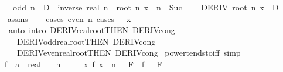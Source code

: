 \begin{isabellebody}
\ \ \ \ \ {\isachardoublequoteopen}odd\ n\ {\isasymLongrightarrow}\ D\ {\isacharequal}{\kern0pt}\ inverse\ {\isacharparenleft}{\kern0pt}real\ n\ {\isacharasterisk}{\kern0pt}\ root\ n\ x\ {\isacharcircum}{\kern0pt}\ {\isacharparenleft}{\kern0pt}n\ {\isacharminus}{\kern0pt}\ Suc\ {}{\isacharparenright}{\kern0pt}{\isacharparenright}{\kern0pt}{\isachardoublequoteclose}\isanewline
\ \ \ {\isachardoublequoteopen}DERIV\ {\isacharparenleft}{\kern0pt}root\ n{\isacharparenright}{\kern0pt}\ x\ {\isacharcolon}{\kern0pt}{\isachargreater}{\kern0pt}\ D{\isachardoublequoteclose}\isanewline
%
\isadelimproof
\ \ %
\endisadelimproof
%
\isatagproof
{}\isamarkupfalse%
\ assms\isanewline
\ \ \isamarkupfalse%
\ {\isacharparenleft}{\kern0pt}cases\ {\isachardoublequoteopen}even\ n{\isachardoublequoteclose}{\isacharcomma}{\kern0pt}\ cases\ {\isachardoublequoteopen}{}\ {\isacharless}{\kern0pt}\ x{\isachardoublequoteclose}{\isacharparenright}{\kern0pt}\isanewline
\ \ \ \ {\isacharparenleft}{\kern0pt}auto\ intro{\isacharcolon}{\kern0pt}\ DERIV{\isacharunderscore}{\kern0pt}real{\isacharunderscore}{\kern0pt}root{\isacharbrackleft}{\kern0pt}THEN\ DERIV{\isacharunderscore}{\kern0pt}cong{\isacharbrackright}{\kern0pt}\isanewline
\ \ \ \ \ \ DERIV{\isacharunderscore}{\kern0pt}odd{\isacharunderscore}{\kern0pt}real{\isacharunderscore}{\kern0pt}root{\isacharbrackleft}{\kern0pt}THEN\ DERIV{\isacharunderscore}{\kern0pt}cong{\isacharbrackright}{\kern0pt}\isanewline
\ \ \ \ \ \ DERIV{\isacharunderscore}{\kern0pt}even{\isacharunderscore}{\kern0pt}real{\isacharunderscore}{\kern0pt}root{\isacharbrackleft}{\kern0pt}THEN\ DERIV{\isacharunderscore}{\kern0pt}cong{\isacharbrackright}{\kern0pt}{\isacharparenright}{\kern0pt}%
\endisatagproof
{\isafoldproof}%
%
\isadelimproof
\isanewline
%
\endisadelimproof
\isanewline
{}\isamarkupfalse%
\ power{\isacharunderscore}{\kern0pt}tendsto{\isacharunderscore}{\kern0pt}{}{\isacharunderscore}{\kern0pt}iff\ {\isacharbrackleft}{\kern0pt}simp{\isacharbrackright}{\kern0pt}{\isacharcolon}{\kern0pt}\isanewline
\ \ \ f\ {\isacharcolon}{\kern0pt}{\isacharcolon}{\kern0pt}\ {\isachardoublequoteopen}{\isacharprime}{\kern0pt}a\ {\isasymRightarrow}\ real{\isachardoublequoteclose}\isanewline
\ \ \ {\isachardoublequoteopen}n\ {\isachargreater}{\kern0pt}\ {}{\isachardoublequoteclose}\isanewline
\ \ \ {\isachardoublequoteopen}{\isacharparenleft}{\kern0pt}{\isacharparenleft}{\kern0pt}{\isasymlambda}x{\isachardot}{\kern0pt}\ f\ x\ {\isacharcircum}{\kern0pt}\ n{\isacharparenright}{\kern0pt}\ {\isasymlonglongrightarrow}\ {}{\isacharparenright}{\kern0pt}\ F\ {\isasymlongleftrightarrow}\ {\isacharparenleft}{\kern0pt}f\ {\isasymlonglongrightarrow}\ {}{\isacharparenright}{\kern0pt}\ F{\isachardoublequoteclose}\isanewline

\end{isabellebody}
